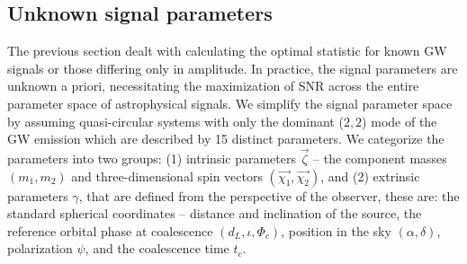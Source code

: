 






\subsection{Unknown signal parameters}\label{sec:MF-maximization}
The previous section dealt with calculating the optimal statistic for known GW signals or those differing only in amplitude. In practice, the signal parameters are unknown a priori,  necessitating the maximization of SNR across the entire parameter space of astrophysical signals. We simplify the signal parameter space by assuming quasi-circular systems with only the dominant ($2,2$) mode of the GW emission which are described by 15 distinct parameters. We categorize the parameters into two groups: (1) intrinsic parameters $\vec{\zeta}$ -- the component masses $(m_1, m_2)$ and three-dimensional spin vectors $(\vec{\chi_1}, \vec{\chi_2})$, and (2) extrinsic parameters $\gamma$, that are defined from the perspective of the observer, these are: the standard spherical coordinates -- distance and inclination of the source, the reference orbital phase at coalescence $(d_L, \iota, \Phi_c)$, position in the sky $(\alpha, \delta)$, polarization $\psi$, and the coalescence time $t_c$.

